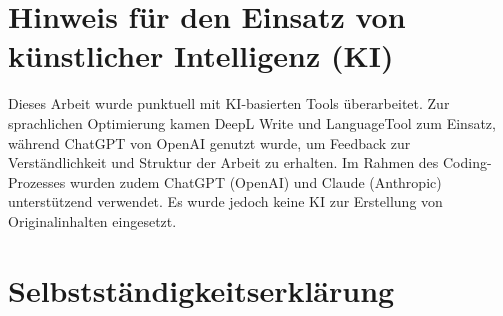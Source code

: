 \documentclass{template}
\begin{document}
\begingroup
  \let\clearpage\relax
  \let\cleardoublepage\relax
  \listoffigures
  \listoftables
\endgroup


\clearpage
{}




\clearpage



\clearpage



\clearpage



\clearpage



\clearpage



\clearpage



\clearpage


\clearpage
\printglossary[label=sec:glossary]



\clearpage
{}
\printbibliography[heading=bibintoc, title=Literaturverzeichnis]

\clearpage

\section*{Hinweis für den Einsatz von künstlicher Intelligenz (KI)}

Dieses Arbeit wurde punktuell mit KI-basierten Tools überarbeitet. Zur sprachlichen Optimierung kamen DeepL Write und LanguageTool zum Einsatz, während ChatGPT von OpenAI genutzt wurde, um Feedback zur Verständlichkeit und Struktur der Arbeit zu erhalten. Im Rahmen des Coding-Prozesses wurden zudem ChatGPT (OpenAI) und Claude (Anthropic) unterstützend verwendet. Es wurde jedoch keine KI zur Erstellung von Originalinhalten eingesetzt.


\clearpage

\section*{Selbstständigkeitserklärung}
\end{document}
